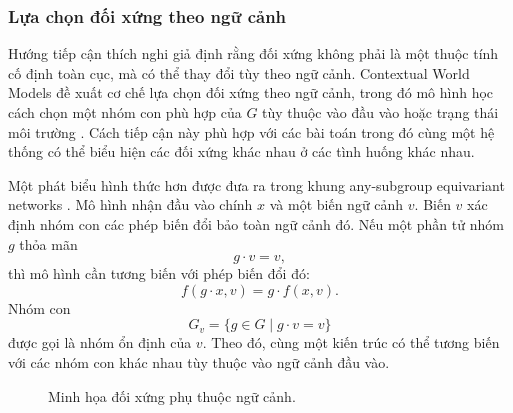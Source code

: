 \subsubsection{Lựa chọn đối xứng theo ngữ cảnh}

Hướng tiếp cận thích nghi giả định rằng đối xứng không phải là một thuộc tính cố định toàn cục, mà có thể thay đổi tùy theo ngữ cảnh. Contextual World Models đề xuất cơ chế lựa chọn đối xứng theo ngữ cảnh, trong đó mô hình học cách chọn một nhóm con phù hợp của $G$ tùy thuộc vào đầu vào hoặc trạng thái môi trường \cite{gupta2024contextual}. Cách tiếp cận này phù hợp với các bài toán trong đó cùng một hệ thống có thể biểu hiện các đối xứng khác nhau ở các tình huống khác nhau.

Một phát biểu hình thức hơn được đưa ra trong khung any-subgroup equivariant networks \cite{goel2025anysubgroup}. Mô hình nhận đầu vào chính $x$ và một biến ngữ cảnh $v$. Biến $v$ xác định nhóm con các phép biến đổi bảo toàn ngữ cảnh đó. Nếu một phần tử nhóm $g$ thỏa mãn
\begin{equation}
    g \cdot v = v,
    \label{eq:context-stabilizer}
\end{equation}
thì mô hình cần tương biến với phép biến đổi đó:
\begin{equation}
    f(g \cdot x, v)
    =
    g \cdot f(x, v).
    \label{eq:any-subgroup-equivariance}
\end{equation}
Nhóm con
\begin{equation}
    G_v
    =
    \{g \in G \mid g \cdot v = v\}
    \label{eq:context-dependent-subgroup}
\end{equation}
được gọi là nhóm ổn định của $v$. Theo đó, cùng một kiến trúc có thể tương biến với các nhóm con khác nhau tùy thuộc vào ngữ cảnh đầu vào.

\begin{figure}[H]
    \centering
    \caption{Minh họa đối xứng phụ thuộc ngữ cảnh.}
    \label{fig:context-dependent-symmetry}
\end{figure}

